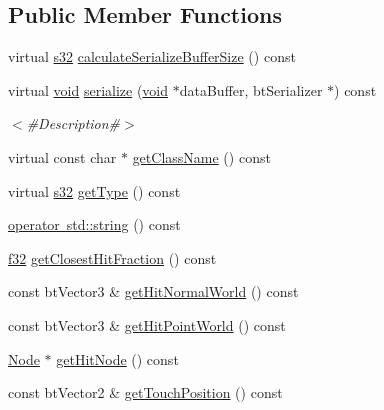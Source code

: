 \subsection*{Public Member Functions}
\begin{DoxyCompactItemize}
\item 
virtual \mbox{\hyperlink{_util_8h_aa62c75d314a0d1f37f79c4b73b2292e2}{s32}} \mbox{\hyperlink{classnjli_1_1_physics_ray_contact_a137ae28469554d1e1a9f932fdb3f808f}{calculate\+Serialize\+Buffer\+Size}} () const
\item 
virtual \mbox{\hyperlink{_thread_8h_af1e856da2e658414cb2456cb6f7ebc66}{void}} \mbox{\hyperlink{classnjli_1_1_physics_ray_contact_a7dc16a5e0bd9c514c615393f2e96a99b}{serialize}} (\mbox{\hyperlink{_thread_8h_af1e856da2e658414cb2456cb6f7ebc66}{void}} $\ast$data\+Buffer, bt\+Serializer $\ast$) const
\begin{DoxyCompactList}\small\item\em $<$\#\+Description\#$>$ \end{DoxyCompactList}\item 
virtual const char $\ast$ \mbox{\hyperlink{classnjli_1_1_physics_ray_contact_a0359afcb01f851ad9774bda869bc8eea}{get\+Class\+Name}} () const
\item 
virtual \mbox{\hyperlink{_util_8h_aa62c75d314a0d1f37f79c4b73b2292e2}{s32}} \mbox{\hyperlink{classnjli_1_1_physics_ray_contact_a0bb5770242ff196aa9c3102fc4baa731}{get\+Type}} () const
\item 
\mbox{\hyperlink{classnjli_1_1_physics_ray_contact_ada58cfcde104252f771ad6d1b604f7f7}{operator std\+::string}} () const
\item 
\mbox{\hyperlink{_util_8h_a5f6906312a689f27d70e9d086649d3fd}{f32}} \mbox{\hyperlink{classnjli_1_1_physics_ray_contact_a911887e0780b9a95c0d003833034f58f}{get\+Closest\+Hit\+Fraction}} () const
\item 
const bt\+Vector3 \& \mbox{\hyperlink{classnjli_1_1_physics_ray_contact_a69ed826971b15e1dac145fe0f220663d}{get\+Hit\+Normal\+World}} () const
\item 
const bt\+Vector3 \& \mbox{\hyperlink{classnjli_1_1_physics_ray_contact_ae4a0bc9a07a0a504fecd776424ee89f9}{get\+Hit\+Point\+World}} () const
\item 
\mbox{\hyperlink{classnjli_1_1_node}{Node}} $\ast$ \mbox{\hyperlink{classnjli_1_1_physics_ray_contact_aa7508ae743098d57b2e11862decfeb2f}{get\+Hit\+Node}} () const
\item 
const bt\+Vector2 \& \mbox{\hyperlink{classnjli_1_1_physics_ray_contact_aead7a5c4b596bb008533c4d75ec06054}{get\+Touch\+Position}} () const

\end{DoxyCompactItemize}
